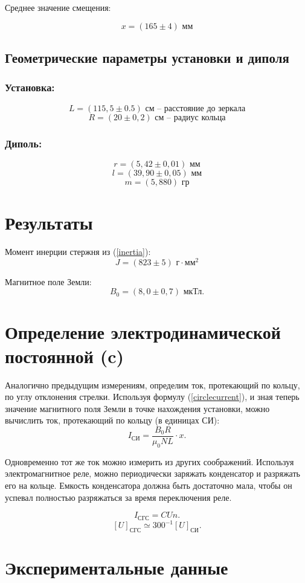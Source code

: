 \documentclass[a4paper, 12pt]{article}
\begin{document}
Среднее значение смещения:

$$x = (165\pm4) \text{ мм}$$

\subsection*{Геометрические параметры установки и диполя}
\subsubsection*{Установка:}
$$L = (115,5\pm0.5) \text{ см -- расстояние до зеркала}$$
$$R = (20\pm0,2) \text{ см -- радиус кольца}$$
\subsubsection*{Диполь:}
$$r = (5,42\pm0,01) \text{ мм}$$
$$l = (39,90\pm0,05) \text{ мм}$$
$$m = (5,880) \text{ гр}$$

\section*{Результаты}
Момент инерции стержня из (\ref{inertia}):
$$ J = (823\pm5) \text{ г}\cdot\text{мм}^2$$

Магнитное поле Земли:
$$ B_0 = (8,0\pm0,7)\text{ мкТл.}$$


\section{Определение электродинамической постоянной ($\mathbf c$)}
Аналогично предыдущим измерениям, определим ток, протекающий по кольцу, по углу отклонения стрелки. Используя формулу (\ref{circlecurrent}), и зная теперь значение магнитного поля Земли в точке нахождения установки, можно вычислить ток, протекающий по кольцу (в единицах СИ):
$$I_\text{СИ}=\frac{B_0 R}{\mu_0 N L} \cdot x.$$

Одновременно тот же ток можно измерить из других соображений. Используя электромагнитное реле, можно периодически заряжать конденсатор и разряжать его на кольце. Емкость конденсатора должна быть достаточно мала, чтобы он успевал полностью разряжаться за время переключения реле.

$$I_\text{СГС}=CUn.$$
$$[U]_\text{СГС}\simeq300^{-1}[U]_\text{СИ}.$$



\section*{Экспериментальные данные}
\end{document}
